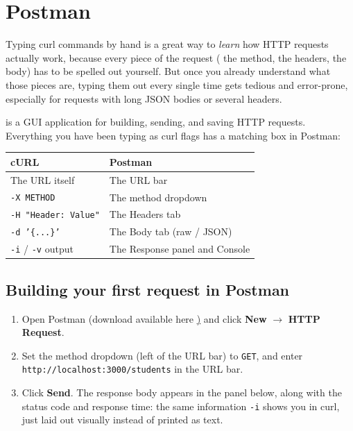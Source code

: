 \section{Postman}
 
Typing curl commands by hand is a great way to \emph{learn} how HTTP
requests actually work, because every piece of the request (
the method, the headers, the body) has to be spelled out yourself.
But once you already understand what those pieces are, typing them out
every single time gets tedious and error-prone, especially for requests
with long JSON bodies or several headers.
 
 is a GUI application for building, sending, and
saving HTTP requests. Everything you have been typing as curl flags has
a matching box in Postman:
 
\begin{table}[]
  \begin{tabular}{|l|l|}
    \hline
    \textbf{cURL}                         & \textbf{Postman}                 \\ \hline
    The URL itself                        & The URL bar                      \\ \hline
    \texttt{-X METHOD}                    & The method dropdown               \\ \hline
    \texttt{-H "Header: Value"}           & The Headers tab                   \\ \hline
    \texttt{-d '\{...\}'}                 & The Body tab (raw / JSON)         \\ \hline
    \texttt{-i} / \texttt{-v} output      & The Response panel and Console    \\ \hline
  \end{tabular}
\end{table}
 
\subsection{Building your first request in Postman}
 
\begin{enumerate}
  \item Open Postman (download available here \href{https://www.postman.com/}) and click \textbf{New} $\rightarrow$
        \textbf{HTTP Request}.
  \item Set the method dropdown (left of the URL bar) to \texttt{GET},
        and enter \texttt{http://localhost:3000/students} in the URL bar.
  \item Click \textbf{Send}. The response body appears in the panel
        below, along with the status code and response time: the same
        information \texttt{-i} shows you in curl, just laid out visually
        instead of printed as text.
\end{enumerate}
 
